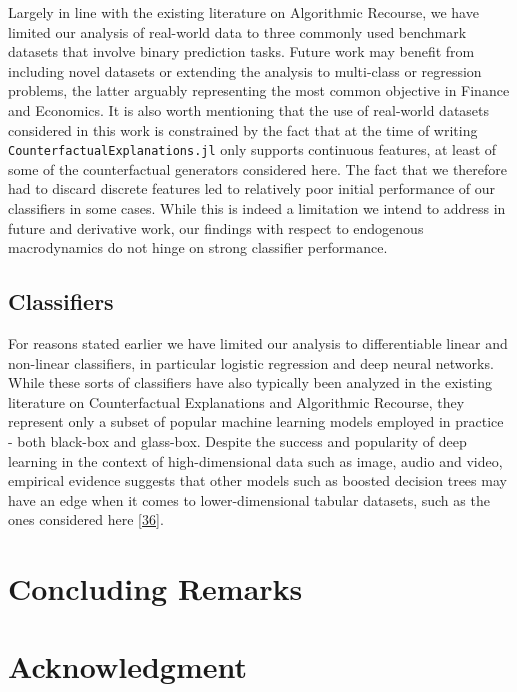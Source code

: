 \documentclass[
  conference]{IEEEtran}
\begin{document}
Largely in line with the existing literature on Algorithmic Recourse, we
have limited our analysis of real-world data to three commonly used
benchmark datasets that involve binary prediction tasks. Future work may
benefit from including novel datasets or extending the analysis to
multi-class or regression problems, the latter arguably representing the
most common objective in Finance and Economics. It is also worth
mentioning that the use of real-world datasets considered in this work
is constrained by the fact that at the time of writing
\texttt{CounterfactualExplanations.jl} only supports continuous
features, at least of some of the counterfactual generators considered
here. The fact that we therefore had to discard discrete features led to
relatively poor initial performance of our classifiers in some cases.
While this is indeed a limitation we intend to address in future and
derivative work, our findings with respect to endogenous macrodynamics
do not hinge on strong classifier performance.

\hypertarget{classifiers}{%
\subsection{Classifiers}\label{classifiers}}

For reasons stated earlier we have limited our analysis to
differentiable linear and non-linear classifiers, in particular logistic
regression and deep neural networks. While these sorts of classifiers
have also typically been analyzed in the existing literature on
Counterfactual Explanations and Algorithmic Recourse, they represent
only a subset of popular machine learning models employed in practice -
both black-box and glass-box. Despite the success and popularity of deep
learning in the context of high-dimensional data such as image, audio
and video, empirical evidence suggests that other models such as boosted
decision trees may have an edge when it comes to lower-dimensional
tabular datasets, such as the ones considered here
\protect\hyperlink{ref-grinsztajn2022tree}{{[}36{]}}.

\hypertarget{sec-conclusion}{%
\section{Concluding Remarks}\label{sec-conclusion}}

\hypertarget{acknowledgment}{%
\section*{Acknowledgment}\label{acknowledgment}}
\end{document}
